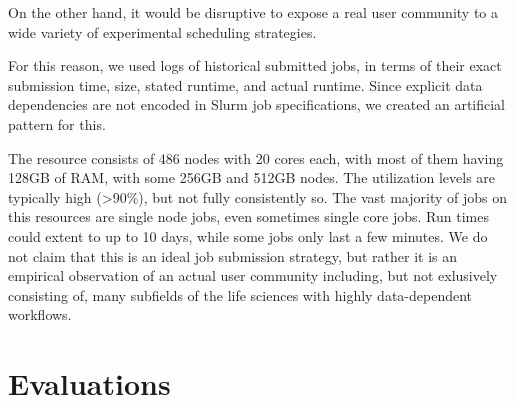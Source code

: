 \documentclass[conference,10pt]{IEEEtran}
\begin{document}
On the other hand, it would be disruptive to expose a real user community to a wide variety of experimental scheduling strategies.

For this reason, we used logs of historical submitted jobs, in terms of their exact submission time, size, stated runtime, and actual runtime.
Since explicit data dependencies are not encoded in Slurm job specifications, we created an artificial pattern for this. 

The resource consists of 486 nodes with 20 cores each, with most of them having 128GB of RAM, with some 256GB and 512GB nodes.
The utilization levels are typically high (>90\%), but
not fully consistently so. The vast majority of jobs on this resources are single node jobs, even sometimes single core jobs. Run times
could extent to up to 10 days, while some jobs only last a few minutes. We do not claim that this is an ideal job submission strategy,
but rather it is an empirical observation of an actual user community including, but not exlusively consisting of, many subfields of the life sciences
with highly data-dependent workflows.

\section{Evaluations}\label{sec.evaluations}
\end{document}
